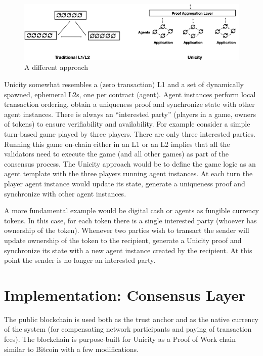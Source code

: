 \documentclass{article}
\begin{document}
\begin{figure}[htbp]
    \centering
    \includegraphics[width=\textwidth]{Comparison.png}
    \caption{A different approach}
    \label{fig:comp}
\end{figure}

Unicity somewhat resembles a (zero transaction) L1 and a set of dynamically spawned, ephemeral L2s, one per contract (agent). Agent instances perform local transaction ordering, obtain a uniqueness proof and synchronize state with other agent instances. There is always an ``interested party'' (players in a game, owners of tokens) to ensure verifiability and availability. For example consider a simple turn-based game played by three players. There are only three interested parties. Running this game on-chain either in an L1 or an L2 implies that all the validators  need to execute the game (and all other games) as part of the consensus process. The Unicity approach would be to define the game logic as an agent template with the three players running agent instances. At each turn the player agent instance would update its state, generate a uniqueness proof and synchronize with other agent instances.



 A more fundamental example would be digital cash or agents as fungible currency tokens. In this case, for each token there is a single interested party (whoever has ownership of the token). Whenever two parties wish to transact the sender will update ownership of the token to the recipient, generate a Unicity proof and synchronize its state with a new agent instance created by the recipient. At this point the sender is no longer an interested party.


\section{Implementation: Consensus Layer}

The public blockchain is used both as the trust anchor and as the native currency of the system (for compensating network participants and paying of transaction fees). The blockchain is purpose-built for Unicity as a Proof of Work chain similar to Bitcoin with a few modifications.
\end{document}
